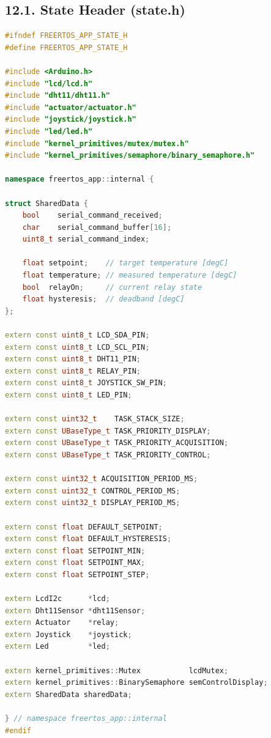\documentclass[12pt]{article}
\begin{document}
\subsection*{12.1. State Header (state.h)}

\begin{lstlisting}[language=C++, caption=state.h -- Shared State and Constants]
#ifndef FREERTOS_APP_STATE_H
#define FREERTOS_APP_STATE_H

#include <Arduino.h>
#include "lcd/lcd.h"
#include "dht11/dht11.h"
#include "actuator/actuator.h"
#include "joystick/joystick.h"
#include "led/led.h"
#include "kernel_primitives/mutex/mutex.h"
#include "kernel_primitives/semaphore/binary_semaphore.h"

namespace freertos_app::internal {

struct SharedData {
    bool    serial_command_received;
    char    serial_command_buffer[16];
    uint8_t serial_command_index;

    float setpoint;    // target temperature [degC]
    float temperature; // measured temperature [degC]
    bool  relayOn;     // current relay state
    float hysteresis;  // deadband [degC]
};

extern const uint8_t LCD_SDA_PIN;
extern const uint8_t LCD_SCL_PIN;
extern const uint8_t DHT11_PIN;
extern const uint8_t RELAY_PIN;
extern const uint8_t JOYSTICK_SW_PIN;
extern const uint8_t LED_PIN;

extern const uint32_t    TASK_STACK_SIZE;
extern const UBaseType_t TASK_PRIORITY_DISPLAY;
extern const UBaseType_t TASK_PRIORITY_ACQUISITION;
extern const UBaseType_t TASK_PRIORITY_CONTROL;

extern const uint32_t ACQUISITION_PERIOD_MS;
extern const uint32_t CONTROL_PERIOD_MS;
extern const uint32_t DISPLAY_PERIOD_MS;

extern const float DEFAULT_SETPOINT;
extern const float DEFAULT_HYSTERESIS;
extern const float SETPOINT_MIN;
extern const float SETPOINT_MAX;
extern const float SETPOINT_STEP;

extern LcdI2c      *lcd;
extern Dht11Sensor *dht11Sensor;
extern Actuator    *relay;
extern Joystick    *joystick;
extern Led         *led;

extern kernel_primitives::Mutex           lcdMutex;
extern kernel_primitives::BinarySemaphore semControlDisplay;
extern SharedData sharedData;

} // namespace freertos_app::internal
#endif
\end{lstlisting}
\end{document}
